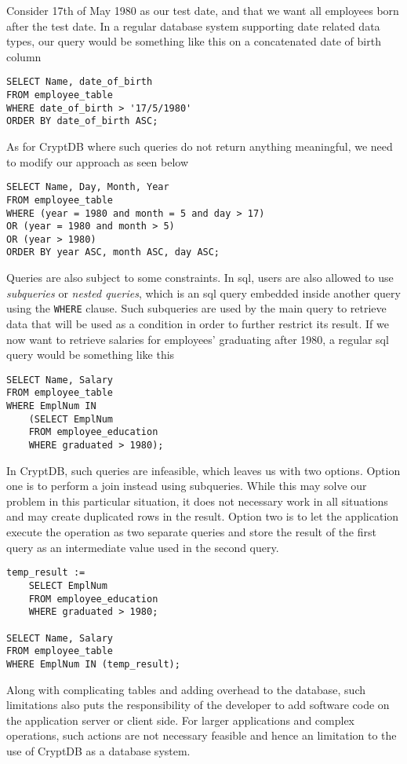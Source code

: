 Consider 17th of May 1980 as our test date, and that we want all employees born after the test date. In a regular database system supporting date related data types, our query would be something like this on a concatenated date of birth column

\begin{verbatim}
SELECT Name, date_of_birth
FROM employee_table
WHERE date_of_birth > '17/5/1980'
ORDER BY date_of_birth ASC;
\end{verbatim}

As for CryptDB where such queries do not return anything meaningful, we need to modify our approach as seen below

\begin{verbatim}
SELECT Name, Day, Month, Year
FROM employee_table
WHERE (year = 1980 and month = 5 and day > 17)
OR (year = 1980 and month > 5)
OR (year > 1980)
ORDER BY year ASC, month ASC, day ASC;
\end{verbatim}

Queries are also subject to some constraints. In \gls{sql}, users are also allowed to use \emph{subqueries} or \emph{nested queries}, which is an \gls{sql} query embedded inside another query using the \verb!WHERE! clause. Such subqueries are used by the main query to retrieve data that will be used as a condition in order to further restrict its result. If we now want to retrieve salaries for employees' graduating after 1980, a regular \gls{sql} query would be something like this

\begin{verbatim}
SELECT Name, Salary
FROM employee_table
WHERE EmplNum IN
    (SELECT EmplNum
    FROM employee_education
    WHERE graduated > 1980);
\end{verbatim}

In CryptDB, such queries are infeasible, which leaves us with two options. Option one is to perform a join instead using subqueries. While this may solve our problem in this particular situation, it does not necessary work in all situations and may create duplicated rows in the result. Option two is to let the application execute the operation as two separate queries and store the result of the first query as an intermediate value used in the second query.

\begin{verbatim}
temp_result :=
    SELECT EmplNum
    FROM employee_education
    WHERE graduated > 1980;

SELECT Name, Salary
FROM employee_table 
WHERE EmplNum IN (temp_result);
\end{verbatim}


Along with complicating tables and adding overhead to the database, such limitations also puts the responsibility of the developer to add software code on the application server or client side. For larger applications and complex operations, such actions are not necessary feasible and hence an limitation to the use of CryptDB as a database system.